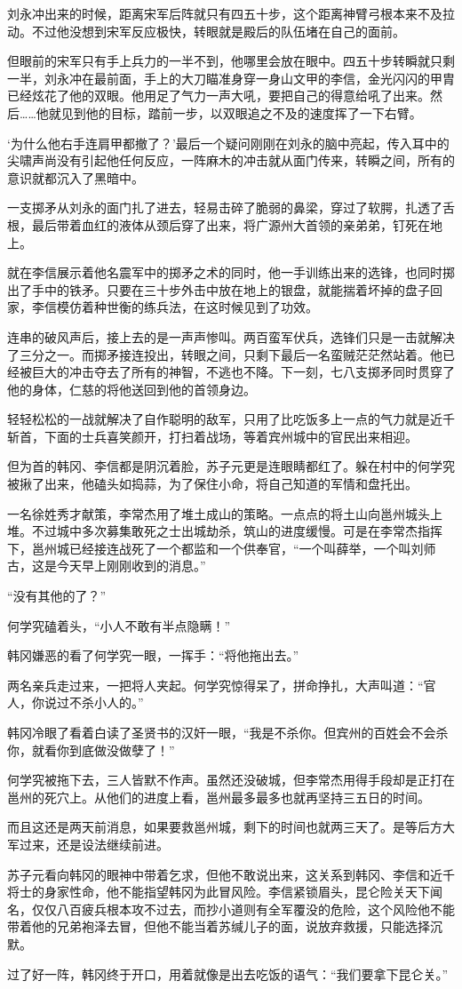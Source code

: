 刘永冲出来的时候，距离宋军后阵就只有四五十步，这个距离神臂弓根本来不及拉动。不过他没想到宋军反应极快，转眼就是殿后的队伍堵在自己的面前。

但眼前的宋军只有手上兵力的一半不到，他哪里会放在眼中。四五十步转瞬就只剩一半，刘永冲在最前面，手上的大刀瞄准身穿一身山文甲的李信，金光闪闪的甲胄已经炫花了他的双眼。他用足了气力一声大吼，要把自己的得意给吼了出来。然后……他就见到他的目标，踏前一步，以双眼追之不及的速度挥了一下右臂。

‘为什么他右手连肩甲都撤了？’最后一个疑问刚刚在刘永的脑中亮起，传入耳中的尖啸声尚没有引起他任何反应，一阵麻木的冲击就从面门传来，转瞬之间，所有的意识就都沉入了黑暗中。

一支掷矛从刘永的面门扎了进去，轻易击碎了脆弱的鼻梁，穿过了软腭，扎透了舌根，最后带着血红的液体从颈后穿了出来，将广源州大首领的亲弟弟，钉死在地上。

就在李信展示着他名震军中的掷矛之术的同时，他一手训练出来的选锋，也同时掷出了手中的铁矛。只要在三十步外击中放在地上的银盘，就能揣着坏掉的盘子回家，李信模仿着种世衡的练兵法，在这时候见到了功效。

连串的破风声后，接上去的是一声声惨叫。两百蛮军伏兵，选锋们只是一击就解决了三分之一。而掷矛接连投出，转眼之间，只剩下最后一名蛮贼茫茫然站着。他已经被巨大的冲击夺去了所有的神智，不逃也不降。下一刻，七八支掷矛同时贯穿了他的身体，仁慈的将他送回到他的首领身边。

轻轻松松的一战就解决了自作聪明的敌军，只用了比吃饭多上一点的气力就是近千斩首，下面的士兵喜笑颜开，打扫着战场，等着宾州城中的官民出来相迎。

但为首的韩冈、李信都是阴沉着脸，苏子元更是连眼睛都红了。躲在村中的何学究被揪了出来，他磕头如捣蒜，为了保住小命，将自己知道的军情和盘托出。

一名徐姓秀才献策，李常杰用了堆土成山的策略。一点点的将土山向邕州城头上堆。不过城中多次募集敢死之士出城劫杀，筑山的进度缓慢。可是在李常杰指挥下，邕州城已经接连战死了一个都监和一个供奉官，“一个叫薛举，一个叫刘师古，这是今天早上刚刚收到的消息。”

“没有其他的了？”

何学究磕着头，“小人不敢有半点隐瞒！”

韩冈嫌恶的看了何学究一眼，一挥手：“将他拖出去。”

两名亲兵走过来，一把将人夹起。何学究惊得呆了，拼命挣扎，大声叫道：“官人，你说过不杀小人的。”

韩冈冷眼了看着白读了圣贤书的汉奸一眼，“我是不杀你。但宾州的百姓会不会杀你，就看你到底做没做孽了！”

何学究被拖下去，三人皆默不作声。虽然还没破城，但李常杰用得手段却是正打在邕州的死穴上。从他们的进度上看，邕州最多最多也就再坚持三五日的时间。

而且这还是两天前消息，如果要救邕州城，剩下的时间也就两三天了。是等后方大军过来，还是设法继续前进。

苏子元看向韩冈的眼神中带着乞求，但他不敢说出来，这关系到韩冈、李信和近千将士的身家性命，他不能指望韩冈为此冒风险。李信紧锁眉头，昆仑险关天下闻名，仅仅八百疲兵根本攻不过去，而抄小道则有全军覆没的危险，这个风险他不能带着他的兄弟袍泽去冒，但他不能当着苏缄儿子的面，说放弃救援，只能选择沉默。

过了好一阵，韩冈终于开口，用着就像是出去吃饭的语气：“我们要拿下昆仑关。”

